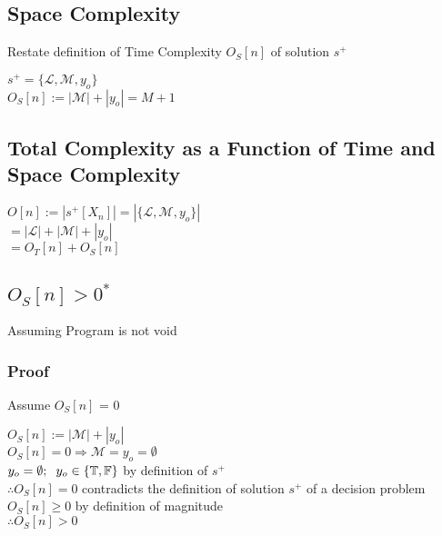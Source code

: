 \documentclass[11pt]{article}
\begin{document}
\subsection{Space Complexity}
Restate definition of Time Complexity $O_S[n]$ of solution $s^+$
\begin{center}
$
s^+ = \{ \mathcal{L},\mathcal{M},y_o\}
$
\\ \vspace{2mm}
$
O_S[n] := |\mathcal{M}| + |y_o| = M + 1
$
\end{center}



\subsection{Total Complexity as a Function of Time and Space Complexity}
\begin{center}
\vspace{4mm}
$
O[n] :=  |s^+[X_n]| = |\{\mathcal{L},\mathcal{M},y_o\}|
$
\\ \vspace{2mm}
$
= |\mathcal{L}| + |\mathcal{M}| + |y_o|
$
\\ \vspace{2mm}
$
= O_T[n] + O_S[n]
$
\end{center}


\subsection{$O_S[n] > 0^*$}
Assuming Program is not void
\subsubsection{Proof}
Assume $O_S[n]$ = 0
\begin{center}
$
O_S[n] := |\mathcal{M}| + |y_o| 
$
\\ \vspace{2mm}
$
O_S[n] = 0 \Rightarrow \mathcal{M} = y_o = \emptyset
$
\\ \vspace{2mm}
$
y_o = \emptyset; \hspace{2mm} y_o \in \{\mathbb{T},\mathbb{F}\}$ by definition of $s^+$
\\ \vspace{4mm}
$
\therefore O_S[n] = 0$ contradicts the definition of solution $s^+$ of a decision problem
\\ \vspace{2mm}
$
O_S[n] \geq 0$ by definition of magnitude
\\ \vspace{2mm}
$
\therefore O_S[n] > 0
$
\end{center}
\end{document}
